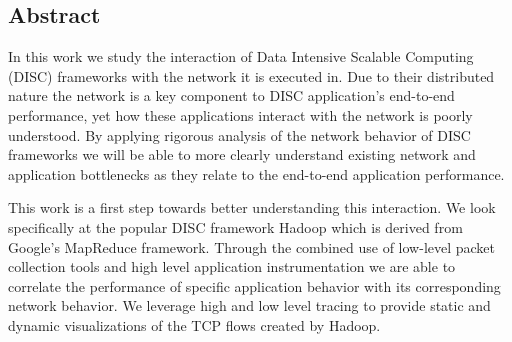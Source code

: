 \subsection*{Abstract}

In this work we study the interaction of Data Intensive Scalable Computing (DISC) 
frameworks with the network it is executed in. Due to their distributed 
nature the network is a key component to DISC application's end-to-end 
performance, yet how these applications interact with the network is poorly 
understood. By applying rigorous analysis of the network behavior of DISC frameworks
we will be able to more clearly understand existing network and application 
bottlenecks as they relate to the end-to-end application performance. 

This work is a first step towards better understanding this interaction. We 
look specifically at the popular DISC framework Hadoop which is derived 
from Google's MapReduce framework. Through the combined use of low-level packet 
collection tools and high level application instrumentation we are able to 
correlate the performance of specific application behavior with its 
corresponding network behavior. We leverage high and low level tracing to 
provide static and dynamic visualizations of the TCP flows created by Hadoop.
